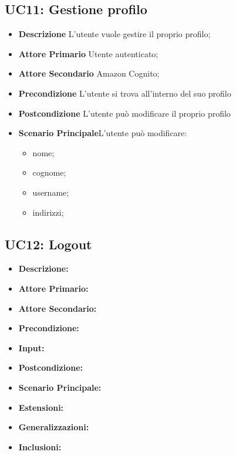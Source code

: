         \subsection{UC11: Gestione profilo}
        \label{sec:UC11}
        \begin{itemize}
            \item \textbf{Descrizione} L'utente vuole gestire il proprio profilo;
            \item \textbf{Attore Primario} Utente autenticato;
            \item \textbf{Attore Secondario} Amazon Cognito;
            \item \textbf{Precondizione} L'utente si trova all'interno del suo profilo
            \item \textbf{Postcondizione} L'utente può modificare il proprio profilo
            \item \textbf{Scenario Principale}L'utente può modificare:
            \begin{itemize}
                \item nome;
                \item cognome;
                \item username;
                \item indirizzi;
            \end{itemize}
        \end{itemize}

        
        \subsection{UC12: Logout}
        \begin{itemize}
            \item \textbf{Descrizione:}
            \item \textbf{Attore Primario:}
            \item \textbf{Attore Secondario:}
            \item \textbf{Precondizione:}
            \item \textbf{Input:}
            \item \textbf{Postcondizione:}
            \item \textbf{Scenario Principale:}
            \item \textbf{Estensioni:}
            \item \textbf{Generalizzazioni:}
            \item \textbf{Inclusioni:}
        \end{itemize}


